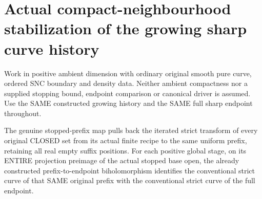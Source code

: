 \section{Actual compact-neighbourhood stabilization of the growing sharp curve history}

Work in positive ambient dimension with ordinary original smooth pure
curve, ordered SNC boundary and density data. Neither ambient compactness
nor a supplied stopping bound, endpoint comparison or canonical driver
is assumed. Use the SAME constructed growing history and the SAME full
sharp endpoint throughout.

\begin{theorem}
\label{hir:sharp-actual-curve-growing-stopped-open-strict-curve}
\leanok
The genuine stopped-prefix map pulls back the iterated strict transform
of every original CLOSED set from its actual finite recipe to the same
uniform prefix, retaining all real empty suffix positions. For each
positive global stage, on its ENTIRE projection preimage of the actual
stopped base open, the already constructed prefix-to-endpoint
biholomorphism identifies the conventional strict curve of that SAME
original prefix with the conventional strict curve of the full endpoint.
\end{theorem}

